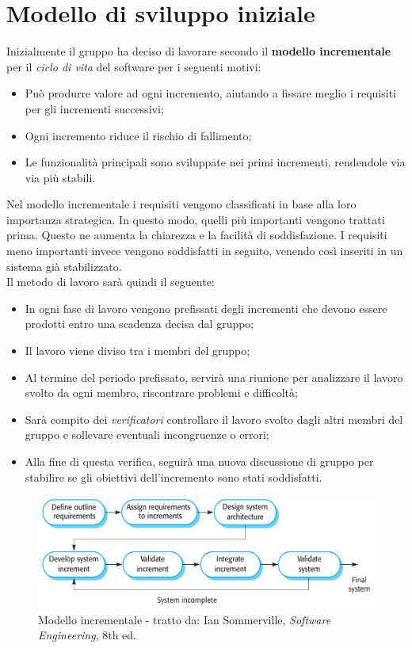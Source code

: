 \section{Modello di sviluppo iniziale} \label{section:modello_di_sviluppo}
Inizialmente il gruppo ha deciso di lavorare secondo il \textbf{modello incrementale} per il \textit{ciclo di vita}\glo{} del software per i seguenti motivi:
\begin{itemize}
  \item Può produrre valore ad ogni incremento, aiutando a fissare meglio i requisiti per gli incrementi successivi;
  \item Ogni incremento riduce il rischio di fallimento;
  \item Le funzionalità principali sono sviluppate nei primi incrementi, rendendole via via più stabili.
\end{itemize}
Nel modello incrementale i requisiti vengono classificati in base alla loro importanza strategica. In questo modo, quelli più importanti vengono
trattati prima. Questo ne aumenta la chiarezza e la facilità di soddisfazione. I requisiti meno importanti invece vengono soddisfatti in seguito,
venendo così inseriti in un sistema già stabilizzato.\\
Il metodo di lavoro sarà quindi il seguente:
\begin{itemize}
  \item In ogni fase di lavoro vengono prefissati degli incrementi che devono essere prodotti entro una scadenza decisa dal gruppo;
  \item Il lavoro viene diviso tra i membri del gruppo;
  \item Al termine del periodo prefissato, servirà una riunione per analizzare il lavoro svolto da ogni membro, riscontrare problemi e difficoltà;
  \item Sarà compito dei \textit{verificatori} controllare il lavoro svolto dagli altri membri del gruppo e sollevare eventuali incongruenze o errori;
  \item Alla fine di questa verifica, seguirà una nuova discussione di gruppo per stabilire se gli obiettivi dell'incremento sono stati soddisfatti.
\end{itemize}

\begin{figure}[H]
  \centering
  \includegraphics[scale=0.6]{immagini/modello_incrementale.png}
  \caption{Modello incrementale - tratto da: Ian Sommerville, \textit{Software Engineering}, 8th ed.}
\end{figure}
\pagebreak

